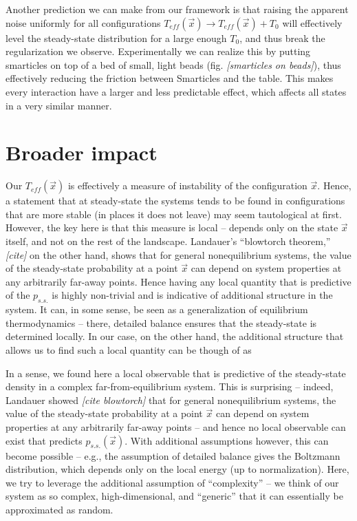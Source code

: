 \documentclass[11pt]{article}
\renewcommand{\v}[1]{\ensuremath{\vec{#1}}} %
\renewcommand{\=}[1]{\stackrel{#1}{=}} %
\renewcommand{\(}{\left (}
\renewcommand{\)}{\right  )}
\renewcommand{\[}{\left [}
\renewcommand{\]}{\right ]}
\newcommand{\<}{\left <}
\renewcommand{\>}{\right >}
\theoremstyle{definition}
\theoremstyle{remark}
\renewcommand{\todo}[1]{\textit{\color{red}[#1]}}
\begin{document}
Another prediction we can make from our framework is that raising the apparent noise uniformly for all configurations $ T_{eff}(\v{x}) \rightarrow T_{eff}(\v{x})+T_0$ will effectively level the steady-state distribution for a large enough $ T_0 $, and thus break the regularization we observe. Experimentally we can realize this by putting smarticles on top of a bed of small, light beads (fig. \todo{smarticles on beads}), thus effectively reducing the friction between Smarticles and the table. This makes every interaction have a larger and less predictable effect, which affects all states in a very similar manner.


\section{Broader impact}
Our $ T_{eff}(\v{x}) $ is effectively a measure of instability of the configuration $ \v{x} $. Hence, a statement that at steady-state the systems tends to be found in configurations that are more stable (in places it does not leave) may seem tautological at first. However, the key here is that this measure is local -- depends only on the state $ \v{x} $ itself, and not on the rest of the landscape. Landauer's ``blowtorch theorem,'' \todo{cite} on the other hand, shows that for general nonequilibrium systems, the value of the steady-state probability at a point $ \v{x} $ can depend on system properties at any arbitrarily far-away points. Hence having any local quantity that is predictive of the $ p_{s.s.} $ is highly non-trivial and is indicative of additional structure in the system. It can, in some sense, be seen as a generalization of equilibrium thermodynamics -- there, detailed balance ensures that the steady-state is determined locally. In our case, on the other hand, the additional structure that allows us to find such a local quantity can be though of as 

In a sense, we found here a local observable that is predictive of the steady-state density in a complex far-from-equilibrium system. This is surprising -- indeed, Landauer showed \todo{cite blowtorch} that for general nonequilibrium systems, the value of the steady-state probability at a point $ \v{x} $ can depend on system properties at any arbitrarily far-away points -- and hence no local observable can exist that predicts $ p_{s.s.}(\v{x}) $. With additional assumptions however, this can become possible -- e.g., the assumption of detailed balance gives the Boltzmann distribution, which depends only on the local energy (up to normalization). Here, we try to leverage the additional assumption of ``complexity'' -- we think of our system as so complex, high-dimensional, and ``generic'' that it can essentially be approximated as random.
\end{document}

